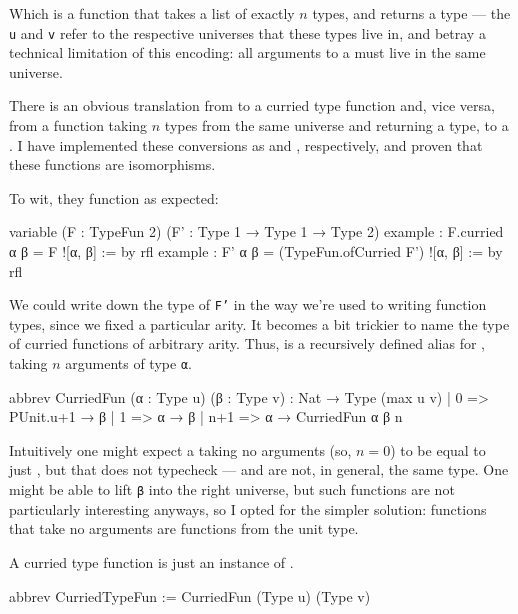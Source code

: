 \documentclass[titlepage]{report}
\begin{document}
Which is a function that takes a list of exactly $n$ types, and returns a type --- the \texttt{u} and
\texttt{v} refer to the respective universes that these types live in, and betray a technical limitation
of this encoding: all arguments to a  must live in the same universe.

There is an obvious translation from  to a curried type function and, vice versa, from
a function taking $n$ types from the same universe and returning a type, to a .
I have implemented these conversions as  and , respectively,
and proven that these functions are isomorphisms. 

To wit, they function as expected:
\begin{leancode}
    variable (F : TypeFun 2) (F' : Type 1 → Type 1 → Type 2)
    example : F.curried α β = F ![α, β]                 := by rfl
    example : F' α β = (TypeFun.ofCurried F') ![α, β]   := by rfl
\end{leancode}

We could write down the type of \texttt{F'} in the way we're used to writing function types, since
we fixed a particular arity. 
It becomes a bit trickier to name the type of curried functions of arbitrary arity.
Thus,  is a recursively defined alias for , 
taking $n$ arguments of type \texttt{α}.
\begin{leancode}
    abbrev CurriedFun (α : Type u) (β : Type v) : Nat → Type (max u v)
      | 0   => PUnit.{u+1} → β
      | 1   => α → β
      | n+1 => α → CurriedFun α β n
\end{leancode}
Intuitively one might expect a  taking no arguments (so, $n = 0$) to be equal to 
just , but that does not typecheck ---  and  are not, in general, the same type.
One might be able to lift \texttt{β} into the right universe, but such functions are not particularly
interesting anyways, so I opted for the simpler solution: functions that take no arguments are
functions from the unit type.

A curried type function is just an instance of .
\begin{leancode}
    abbrev CurriedTypeFun := CurriedFun (Type u) (Type v)
\end{leancode}
\end{document}
